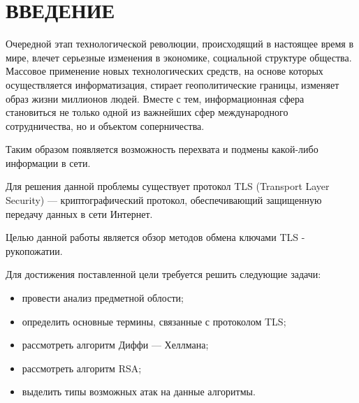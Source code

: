 \chapter*{ВВЕДЕНИЕ}

    Очередной этап технологической революции, происходящий в настоящее время в мире, влечет серьезные изменения в экономике, социальной структуре общества. Массовое применение новых технологических средств, на основе которых осуществляется информатизация, стирает геополитические границы, изменяет образ жизни миллионов людей. Вместе с тем, информационная сфера становиться не только одной из важнейших сфер международного сотрудничества, но и объектом соперничества.
    
    Таким образом появляется возможность перехвата и подмены какой-либо информации в сети.
    
    Для решения данной проблемы существует протокол TLS (Transport Layer Security) --- криптографический протокол, обеспечивающий защищенную передачу данных в сети Интернет.
    
    
    
    Целью данной работы является обзор методов обмена ключами TLS - рукопожатии.
    
    Для достижения поставленной цели требуется решить следующие задачи:
    
    \begin{itemize}
    	\item провести анализ предметной облости;
        \item определить основные термины, связанные с протоколом TLS;
        \item рассмотреть алгоритм Диффи --- Хеллмана;
        \item рассмотреть алгоритм RSA;
        \item выделить типы возможных атак на данные алгоритмы. 
    \end{itemize}